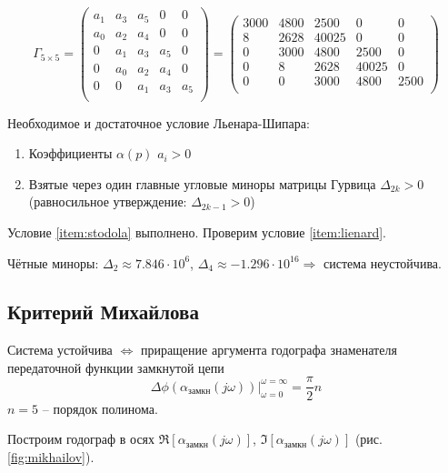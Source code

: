 \documentclass[a4paper,12pt]{article}
\begin{document}
$$
\Gamma_{5 \times 5}=
\begin{pmatrix}
    a_1 & a_3 & a_5 & 0   & 0 \\
    a_0 & a_2 & a_4 & 0   & 0 \\
    0   & a_1 & a_3 & a_5 & 0 \\
    0   & a_0 & a_2 & a_4 & 0 \\
    0   & 0   & a_1 & a_3 & a_5 \\
\end{pmatrix}=
\begin{pmatrix}
    3000 & 4800 & 2500  & 0     & 0 \\
    8    & 2628 & 40025 & 0     & 0 \\
    0    & 3000 & 4800  & 2500  & 0 \\
    0    & 8    & 2628  & 40025 & 0 \\
    0    & 0    & 3000 & 4800   & 2500 \\
\end{pmatrix}
$$

Необходимое и достаточное условие Льенара-Шипара:

\begin{enumerate}[noitemsep]
    \item Коэффициенты $ \alpha(p) $ $ a_i > 0 $ \label{item:stodola}
    \item Взятые через один главные угловые миноры матрицы Гурвица $ \Delta_{2k} > 0 $ (равносильное утверждение: $ \Delta_{2k-1} > 0 $) \label{item:lienard}
\end{enumerate}

Условие \ref{item:stodola} выполнено. Проверим условие \ref{item:lienard}.

Чётные миноры: $ \Delta_2 \approx 7.846 \cdot 10^6$, $ \Delta_4 \approx -1.296 \cdot 10^{16} \Rightarrow $ система неустойчива.

\subsection{ Критерий Михайлова }

Система устойчива $ \Leftrightarrow $ приращение аргумента годографа знаменателя передаточной функции замкнутой цепи
\[ \Delta \phi(\alpha_{\text{замкн}}(j\omega))|_{\omega = 0}^{\omega = \infty} = \frac{\pi}{2} n \]
$ n = 5 $ -- порядок полинома.

Построим годограф в осях $ \Re [ \alpha_{\text{замкн}}(j\omega) ] $, $ \Im [ \alpha_{\text{замкн}}(j\omega) ] $ (рис. \ref{fig:mikhailov}).
\end{document}
